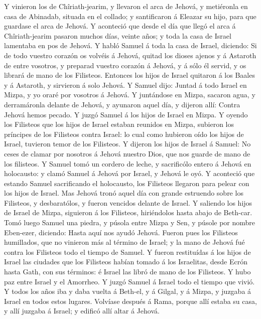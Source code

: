  Y vinieron los de Chîriath-jearim, y llevaron el arca de
Jehová, y metiéronla en casa de Abinadab, situada en el collado; y
santificaron á Eleazar su hijo, para que guardase el arca de Jehová.
 Y aconteció que desde el día que llegó el arca á
Chîriath-jearim pasaron muchos días, veinte años; y toda la casa de
Israel lamentaba en pos de Jehová.  Y habló Samuel á toda
la casa de Israel, diciendo: Si de todo vuestro corazón os volvéis á
Jehová, quitad los dioses ajenos y á Astaroth de entre vosotros, y
preparad vuestro corazón á Jehová, y á sólo él servid, y os librará de
mano de los Filisteos.  Entonces los hijos de Israel
quitaron á los Baales y á Astaroth, y sirvieron á solo Jehová.
 Y Samuel dijo: Juntad á todo Israel en Mizpa, y yo oraré
por vosotros á Jehová.  Y juntándose en Mizpa, sacaron
agua, y derramáronla delante de Jehová, y ayunaron aquel día, y dijeron
allí: Contra Jehová hemos pecado. Y juzgó Samuel á los hijos de Israel
en Mizpa.  Y oyendo los Filisteos que los hijos de Israel
estaban reunidos en Mizpa, subieron los príncipes de los Filisteos
contra Israel: lo cual como hubieron oído los hijos de Israel, tuvieron
temor de los Filisteos.  Y dijeron los hijos de Israel á
Samuel: No ceses de clamar por nosotros á Jehová nuestro Dios, que nos
guarde de mano de los filisteos.  Y Samuel tomó un cordero
de leche, y sacrificólo entero á Jehová en holocausto: y clamó Samuel á
Jehová por Israel, y Jehová le oyó.  Y aconteció que
estando Samuel sacrificando el holocausto, los Filisteos llegaron para
pelear con los hijos de Israel. Mas Jehová tronó aquel día con grande
estruendo sobre los Filisteos, y desbaratólos, y fueron vencidos delante
de Israel.  Y saliendo los hijos de Israel de Mizpa,
siguieron á los Filisteos, hiriéndolos hasta abajo de Beth-car.
 Tomó luego Samuel una piedra, y púsola entre Mizpa y
Sen, y púsole por nombre Eben-ezer, diciendo: Hasta aquí nos ayudó
Jehová.  Fueron pues los Filisteos humillados, que no
vinieron más al término de Israel; y la mano de Jehová fué contra los
Filisteos todo el tiempo de Samuel.  Y fueron restituídas
á los hijos de Israel las ciudades que los Filisteos habían tomado á los
Israelitas, desde Ecrón hasta Gath, con sus términos: é Israel las libró
de mano de los Filisteos. Y hubo paz entre Israel y el Amorrheo.
 Y juzgó Samuel á Israel todo el tiempo que vivió.
 Y todos los años iba y daba vuelta á Beth-el, y á
Gilgal, y á Mizpa, y juzgaba á Israel en todos estos lugares.
 Volvíase después á Rama, porque allí estaba su casa, y
allí juzgaba á Israel; y edificó allí altar á Jehová.


